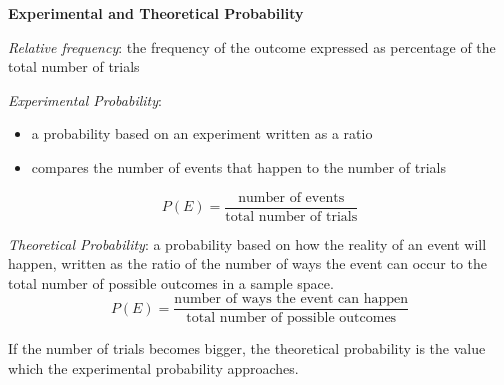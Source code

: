 \begin{center}
\textbf{Experimental and Theoretical Probability
}
\end{center}

\vspace*{1ex}

\emph{Relative frequency}:  the frequency of the outcome expressed as percentage of the total number of trials

\vspce 

\emph{Experimental Probability}: 
\begin{itemize} 
\item a probability based on an experiment written as a ratio
\item compares the number of events that happen to the number of trials 
\end{itemize}  

\[
P(E) = \displaystyle \frac{\text{number of events}}{\text{total number of trials}} 
\] 

\vspce

\emph{Theoretical Probability}: a probability based on how the reality of an event will happen, written as the ratio of the number of ways the event can occur to the total number of possible outcomes in a sample space.
\[
P(E) = \displaystyle \frac{\text{number of ways the event can happen}}{\text{total number of possible outcomes}} 
\] 

\vspce 

If the number of trials becomes bigger, the theoretical probability is the value which the experimental probability approaches.

